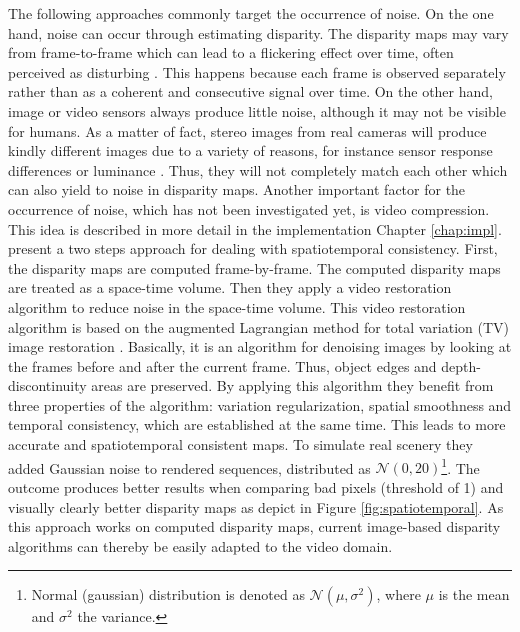 The following approaches commonly target the occurrence of noise.
On the one hand, noise can occur through estimating disparity.
The disparity maps may vary from frame-to-frame which can lead to a flickering effect over time, often perceived as disturbing \citep{khoshabeh2011spatio}.
This happens because each frame is observed separately rather than as a coherent and consecutive signal over time.
On the other hand, image or video sensors always produce little noise, although it may not be visible for humans.
As a matter of fact, stereo images from real cameras will produce kindly different images due to a variety of reasons, for instance sensor response differences or luminance \citep{khoshabeh2011spatio, cyganek2011introduction}.
Thus, they will not completely match each other which can also yield to noise in disparity maps.
Another important factor for the occurrence of noise, which has not been investigated yet, is video compression.
This idea is described in more detail in the implementation Chapter \ref{chap:impl}.
\newline\newline\noindent \citeauthor{khoshabeh2011spatio} \citep{khoshabeh2011spatio} present a two steps approach for dealing with spatiotemporal consistency.
First, the disparity maps are computed frame-by-frame.
The computed disparity maps are treated as a space-time volume.
Then they apply a video restoration algorithm to reduce noise in the space-time volume.
This video restoration algorithm is based on the augmented Lagrangian method for total variation (TV) image restoration \citep{chan2011augmented}.
Basically, it is an algorithm for denoising images by looking at the frames before and after the current frame.
Thus, object edges and depth-discontinuity areas are preserved.
By applying this algorithm they benefit from three properties of the algorithm: variation regularization, spatial smoothness and temporal consistency, which are established at the same time.
This leads to more accurate and spatiotemporal consistent maps.
To simulate real scenery they added Gaussian noise to rendered sequences, distributed as $\mathcal{N}(0,20)$\footnote{Normal (gaussian) distribution is denoted as $\mathcal{N}(\mu,\sigma^2)$, where $\mu$ is the mean and $\sigma^2$ the variance.}.
The outcome produces better results when comparing bad pixels (threshold of 1) and visually clearly better disparity maps as depict in Figure \ref{fig:spatiotemporal}.
As this approach works on computed disparity maps, current image-based disparity algorithms can thereby be easily adapted to the video domain.

